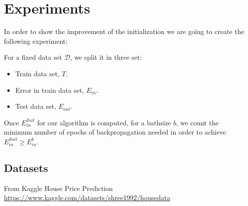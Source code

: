 \section*{Experiments}

In order to show the improvement of 
the initialization we are going to create the following 
experiment: 

For a fixed data set $\mathcal{D}$, we split it in 
three set: 

\begin{itemize}
    \item Train data set, $T$. 
    \item Error in train data set, $E_{in}$. 
    \item Test data set, $E_{out}$. 
\end{itemize}

Once $E_{in}^{Init}$ for our algorithm is computed,
for a bathsize $b$,  we count the minimum number of epochs of backpropagation  
needed in order to achieve $E_{in}^{Init} \geq E_{in}^{b}$. 

\subsection*{Datasets}

From Kaggle House Price Prediction 
\url{https://www.kaggle.com/datasets/shree1992/housedata}
